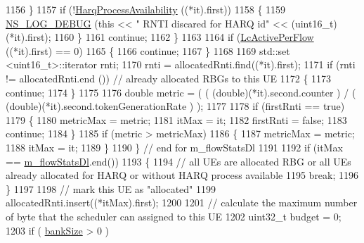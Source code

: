 \begin{DoxyCode}
1156                 \}
1157               \textcolor{keywordflow}{if} (!\hyperlink{classns3_1_1FdTbfqFfMacScheduler_ad6dba4921f9a502a6c02d1f9095f0a17}{HarqProcessAvailability} ((*it).first))
1158                 \{
1159                   \hyperlink{group__logging_ga413f1886406d49f59a6a0a89b77b4d0a}{NS\_LOG\_DEBUG} (\textcolor{keyword}{this} << \textcolor{stringliteral}{" RNTI discared for HARQ id"} << (uint16\_t)(*it).first);
1160                 \}
1161               \textcolor{keywordflow}{continue};
1162            \}
1163           
1164           \textcolor{keywordflow}{if} (\hyperlink{classns3_1_1FdTbfqFfMacScheduler_a606f29c62ab153d6a584da5371070045}{LcActivePerFlow} ((*it).first) == 0)
1165             \{
1166               \textcolor{keywordflow}{continue};
1167             \}
1168 
1169           std::set <uint16\_t>::iterator rnti;
1170           rnti = allocatedRnti.find((*it).first);
1171           \textcolor{keywordflow}{if} (rnti != allocatedRnti.end ())  \textcolor{comment}{//  already allocated RBGs to this UE}
1172             \{
1173               \textcolor{keywordflow}{continue};
1174             \}
1175   
1176           \textcolor{keywordtype}{double} metric = ( ( (double)(*it).second.counter ) / ( (double)(*it).second.tokenGenerationRate )
       );
1177   
1178           \textcolor{keywordflow}{if} (firstRnti == \textcolor{keyword}{true})
1179            \{
1180              metricMax = metric;
1181              itMax = it;
1182              firstRnti = \textcolor{keyword}{false};
1183              \textcolor{keywordflow}{continue};
1184            \}
1185          \textcolor{keywordflow}{if} (metric > metricMax)
1186           \{
1187             metricMax = metric;
1188             itMax = it;
1189           \} 
1190        \} \textcolor{comment}{// end for m\_flowStatsDl}
1191   
1192       \textcolor{keywordflow}{if} (itMax == \hyperlink{classns3_1_1FdTbfqFfMacScheduler_ad55ff3305031aa6d2b3d351145754972}{m\_flowStatsDl}.end())
1193         \{
1194           \textcolor{comment}{// all UEs are allocated RBG or all UEs already allocated for HARQ or without HARQ process
       available}
1195           \textcolor{keywordflow}{break};
1196         \}
1197 
1198       \textcolor{comment}{// mark this UE as "allocated"}
1199       allocatedRnti.insert((*itMax).first);
1200      
1201       \textcolor{comment}{// calculate the maximum number of byte that the scheduler can assigned to this UE}
1202       uint32\_t budget = 0;
1203       \textcolor{keywordflow}{if} ( \hyperlink{classns3_1_1FdTbfqFfMacScheduler_a2e499981c641859beb7ae48a0c343ba1}{bankSize} > 0 )

\end{DoxyCode}
